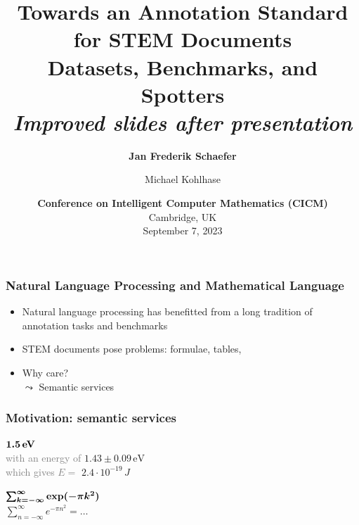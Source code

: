 \documentclass[aspectratio=169]{beamer}
\title{Towards an Annotation Standard for STEM Documents \\\large Datasets, Benchmarks, and Spotters\\\textit{Improved slides after presentation}}
\author{\textbf{Jan Frederik Schaefer} \and Michael Kohlhase}
\institute{FAU Erlangen-N\"urnberg/KWARC}
\date{\textbf{Conference on Intelligent Computer Mathematics (CICM)}\\Cambridge, UK\\September 7, 2023}
\begin{document}
\frame\titlepage

\begin{frame}
    \frametitle{Natural Language Processing and Mathematical Language}
    \begin{itemize}
        \item Natural language processing has benefitted from a long tradition of annotation tasks and benchmarks
        \item STEM documents pose problems:
            formulae, tables, \textellipsis
        \item Why care?\\
            $\leadsto$ Semantic services
    \end{itemize}
\end{frame}


\begin{frame}
    \frametitle{Motivation: semantic services}
    \faSearch\;\; $\bm{1.5\,\text{\bf eV}}$
    \\[1em]
        \quad\quad\faExternalLink\;\; \textcolor{gray}{with an energy of} $1.43 \pm 0.09\,\text{eV}$\\[1em]
        \quad\quad\faExternalLink\;\; \textcolor{gray}{which gives $E=$} $2.4 \cdot 10^{-19}\,J$

    \vspace{3em}
    \faSearch\;\; $\bm{\sum_{k=-\infty}^\infty \text{\bf exp}(-\pi k^2)}$
    \\[1em]
        \quad\quad\faExternalLink\;\; $\sum_{n=-\infty}^\infty e^{-\pi n^2} = \ldots$
\end{frame}
\end{document}
